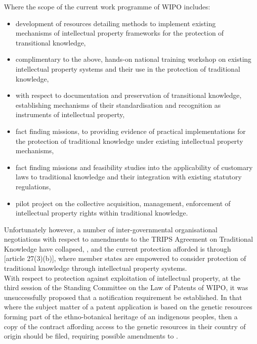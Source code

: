 \documentclass[11pt]{article}
\begin{document}
Where the scope of the current work programme of WIPO includes:
\begin{itemize}
\item development of resources detailing methods to implement existing mechanisms of
intellectual property frameworks for the protection of transitional knowledge,
\item complimentary to the above, hands-on national training workshop on existing
intellectual property systems and their use in the protection of traditional
knowledge,
\item with respect to documentation and preservation of transitional knowledge,
establishing mechanisms of their standardisation and recognition as
instruments of intellectual property,
\item fact finding missions, to providing evidence of practical implementations for
the protection of traditional knowledge under existing intellectual property
mechanisms,
\item fact finding missions and feasibility studies into the applicability of
customary laws to traditional knowledge and their integration with existing
statutory regulations,
\item pilot project on the collective acquisition, management, enforcement of
intellectual property rights within traditional knowledge.
\end{itemize}

Unfortunately however, a number of inter-governmental organisational
negotiations with respect to amendments to the TRIPS \cite{wto17_trips} Agreement
on Traditional Knowledge have collapsed,
\cite{saurombe09_protection_indigenous_trad_knowl_through_ip}, and the current
protection afforded is through [article 27(3)(b)]\cite{wto17_trips}, where member
states are empowered to consider protection of traditional knowledge through
intellectual property systems.\\

With respect to protection against exploitation of intellectual property, at the
third session of the Standing Committee on the Law of Patents of WIPO, it was
unsuccessfully proposed that a notification requirement be established. In that
where the subject matter of a patent application is based on the genetic
resources forming part of the ethno-botanical heritage of an indigenous peoples,
then a copy of the contract affording access to the genetic resources in their
country of origin should be filed, requiring possible amendments to \cite{wipo17_pct_ai,wipo70_pct}
.\\
\end{document}
